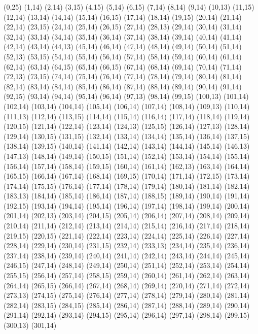 (0,25)
(1,14)
(2,14)
(3,15)
(4,15)
(5,14)
(6,15)
(7,14)
(8,14)
(9,14)
(10,13)
(11,15)
(12,14)
(13,14)
(14,14)
(15,14)
(16,15)
(17,14)
(18,14)
(19,15)
(20,14)
(21,14)
(22,14)
(23,15)
(24,14)
(25,14)
(26,15)
(27,14)
(28,13)
(29,14)
(30,14)
(31,14)
(32,14)
(33,14)
(34,14)
(35,14)
(36,14)
(37,14)
(38,14)
(39,14)
(40,14)
(41,14)
(42,14)
(43,14)
(44,13)
(45,14)
(46,14)
(47,14)
(48,14)
(49,14)
(50,14)
(51,14)
(52,13)
(53,15)
(54,14)
(55,14)
(56,14)
(57,14)
(58,14)
(59,14)
(60,14)
(61,14)
(62,14)
(63,14)
(64,15)
(65,14)
(66,15)
(67,14)
(68,14)
(69,14)
(70,14)
(71,14)
(72,13)
(73,15)
(74,14)
(75,14)
(76,14)
(77,14)
(78,14)
(79,14)
(80,14)
(81,14)
(82,14)
(83,14)
(84,14)
(85,14)
(86,14)
(87,14)
(88,14)
(89,14)
(90,14)
(91,14)
(92,15)
(93,14)
(94,14)
(95,14)
(96,14)
(97,13)
(98,14)
(99,15)
(100,13)
(101,14)
(102,14)
(103,14)
(104,14)
(105,14)
(106,14)
(107,14)
(108,14)
(109,13)
(110,14)
(111,13)
(112,14)
(113,15)
(114,14)
(115,14)
(116,14)
(117,14)
(118,14)
(119,14)
(120,15)
(121,14)
(122,14)
(123,14)
(124,13)
(125,15)
(126,14)
(127,13)
(128,14)
(129,14)
(130,15)
(131,15)
(132,14)
(133,14)
(134,14)
(135,14)
(136,14)
(137,15)
(138,14)
(139,15)
(140,14)
(141,14)
(142,14)
(143,14)
(144,14)
(145,14)
(146,13)
(147,13)
(148,14)
(149,14)
(150,15)
(151,14)
(152,14)
(153,14)
(154,14)
(155,14)
(156,14)
(157,14)
(158,14)
(159,15)
(160,14)
(161,14)
(162,13)
(163,14)
(164,14)
(165,15)
(166,14)
(167,14)
(168,14)
(169,15)
(170,14)
(171,14)
(172,15)
(173,14)
(174,14)
(175,15)
(176,14)
(177,14)
(178,14)
(179,14)
(180,14)
(181,14)
(182,14)
(183,13)
(184,14)
(185,14)
(186,14)
(187,14)
(188,15)
(189,14)
(190,14)
(191,14)
(192,15)
(193,14)
(194,14)
(195,14)
(196,14)
(197,14)
(198,14)
(199,14)
(200,14)
(201,14)
(202,13)
(203,14)
(204,15)
(205,14)
(206,14)
(207,14)
(208,14)
(209,14)
(210,14)
(211,14)
(212,14)
(213,14)
(214,14)
(215,14)
(216,14)
(217,14)
(218,14)
(219,15)
(220,15)
(221,14)
(222,14)
(223,14)
(224,14)
(225,14)
(226,14)
(227,14)
(228,14)
(229,14)
(230,14)
(231,15)
(232,14)
(233,13)
(234,14)
(235,14)
(236,14)
(237,14)
(238,14)
(239,14)
(240,14)
(241,14)
(242,14)
(243,14)
(244,14)
(245,14)
(246,15)
(247,14)
(248,14)
(249,14)
(250,14)
(251,14)
(252,14)
(253,14)
(254,14)
(255,15)
(256,14)
(257,14)
(258,15)
(259,14)
(260,14)
(261,14)
(262,14)
(263,14)
(264,14)
(265,15)
(266,14)
(267,14)
(268,14)
(269,14)
(270,14)
(271,14)
(272,14)
(273,13)
(274,15)
(275,14)
(276,14)
(277,14)
(278,14)
(279,14)
(280,14)
(281,14)
(282,14)
(283,15)
(284,15)
(285,14)
(286,14)
(287,14)
(288,14)
(289,14)
(290,14)
(291,14)
(292,14)
(293,14)
(294,15)
(295,14)
(296,14)
(297,14)
(298,14)
(299,15)
(300,13)
(301,14)
